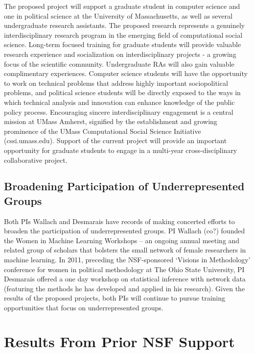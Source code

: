 The proposed project will support a graduate student in computer science and one in political science at the University of Massachusetts, as well as several undergraduate research assistants.  The proposed research represents a genuinely interdisciplinary research program in the emerging field of computational social science. Long-term focused training for graduate students will provide valuable research experience and socialization on interdisciplinary projects - a growing focus of the scientific community. Undergraduate RAs will also gain valuable complimentary experiences. Computer science students will have the opportunity to work on technical problems that address highly important sociopolitical problems, and political science students will be directly exposed to the ways in which technical analysis and innovation can enhance knowledge of the public policy process. Encouraging sincere interdisciplinary engagement is a central mission at UMass Amherst, signified by the establishment and growing prominence of the UMass Computational Social Science Initiative (cssi.umass.edu). Support of the current project will provide an important opportunity for graduate students to engage in a multi-year cross-disciplinary collaborative project.

\subsection{Broadening Participation of Underrepresented Groups}

Both PIs Wallach and Desmarais have records of making concerted efforts to broaden the participation of underrepresented groups. PI Wallach (co?) founded the Women in Machine Learning Workshops -- an ongoing annual meeting and related group of scholars that bolsters the small network of female researchers in machine learning. In 2011, preceding the NSF-sponsored `Visions in Methodology' conference for women in political methodology at The Ohio State University, PI Desmarais offered a one day workshop on statistical inference with network data (featuring the methods he has developed and applied in his research). Given the results of the proposed projects, both PIs will continue to pursue training opportunities that focus on underrepresented groups.



\section{Results From Prior NSF Support}

